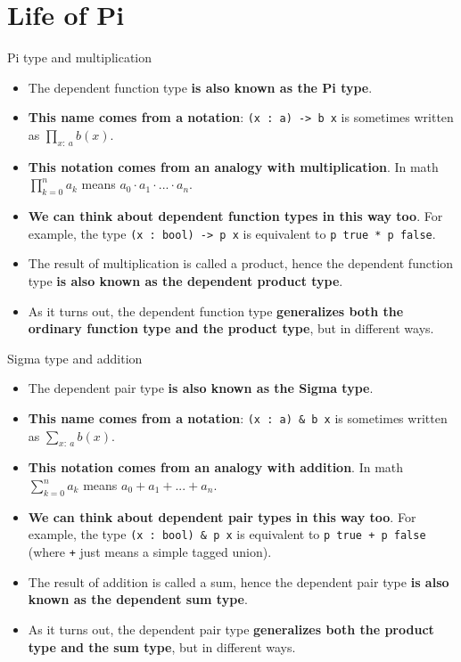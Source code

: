 \documentclass{beamer}
\newcommand{\m}[1]{\texttt{#1}}
\begin{document}
\section{Life of Pi}

\begin{frame}{Pi type and multiplication}
\begin{itemize}
	\item The dependent function type \textbf{is also known as the Pi type}.
	\item \textbf{This name comes from a notation}: \m{(x :\ a) -> b x} is sometimes written as $\displaystyle \prod_{x :\ a} b(x)$.
	\item \textbf{This notation comes from an analogy with multiplication}. In math $\displaystyle \prod_{k = 0}^n a_k$ means $a_0 \cdot a_1 \cdot ... \cdot a_n$.
	\item \textbf{We can think about dependent function types in this way too}. For example, the type \m{(x :\ bool) -> p x} is equivalent to \m{p true * p false}.
	\item The result of multiplication is called a product, hence the dependent function type \textbf{is also known as the dependent product type}.
	\item As it turns out, the dependent function type \textbf{generalizes both the ordinary function type and the product type}, but in different ways.
\end{itemize}
\end{frame}

\begin{frame}{Sigma type and addition}
\begin{itemize}
	\item The dependent pair type \textbf{is also known as the Sigma type}.
	\item \textbf{This name comes from a notation}: \m{(x :\ a) \& b x} is sometimes written as $\displaystyle \sum_{x :\ a} b(x)$.
	\item \textbf{This notation comes from an analogy with addition}. In math $\displaystyle \sum_{k = 0}^n a_k$ means $a_0 + a_1 + ... + a_n$.
	\item \textbf{We can think about dependent pair types in this way too}. For example, the type \m{(x :\ bool) \& p x} is equivalent to \m{p true + p false} (where \m{+} just means a simple tagged union).
	\item The result of addition is called a sum, hence the dependent pair type \textbf{is also known as the dependent sum type}.
	\item As it turns out, the dependent pair type \textbf{generalizes both the product type and the sum type}, but in different ways.
\end{itemize}
\end{frame}
\end{document}

